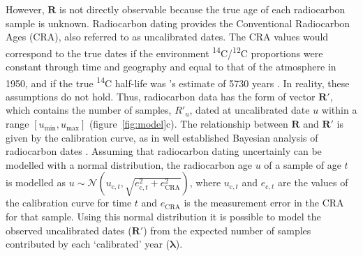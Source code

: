 \documentclass[a4paper]{article}
\begin{document}
However, $\bm{R}$ is not directly observable because the true age of each radiocarbon sample is unknown. Radiocarbon dating provides the Conventional Radiocarbon Ages (CRA), also referred to as uncalibrated dates. The CRA values would correspond to the true dates if the environment \textsuperscript{14}C/\textsuperscript{12}C proportions were constant through time and geography and equal to that of the atmosphere in 1950, and if the true \textsuperscript{14}C half-life was \citeauthor{Libby1949}'s \parencite*{Libby1949} estimate of 5730 years \parencite{BronkRamsey2008}. In reality, these assumptions do not hold. Thus, radiocarbon data has the form of vector $\bm{R'}$, which contains the number of samples, $R'_u$, dated at uncalibrated date $u$ within a range $\left[u_{\mathrm{min}},u_{\mathrm{max}}\right]$ (figure~\ref{fig:model}c). The relationship between $\bm{R}$ and $\bm{R'}$ is given by the calibration curve, as in well established Bayesian analysis of radiocarbon dates \parencite{BronkRamsey2008}. Assuming that radiocarbon dating uncertainly can be modelled with a normal distribution, the radiocarbon age $u$ of a sample of age $t$ is modelled as $u \sim \mathcal{N}\left(u_{\mathrm{c},t},\sqrt{e_{\mathrm{c},t}^2+e_{\mathrm{CRA}}^2}\right)$, where $u_{\mathrm{c},t}$ and $e_{\mathrm{c},t}$ are the values of the calibration curve for time $t$ and $e_{\mathrm{CRA}}$ is the measurement error in the CRA for that sample. Using this normal distribution it is possible to model the observed uncalibrated dates ($\bm{R'}$) from the expected number of samples contributed by each `calibrated' year ($\bm{\lambda}$).
\\

\end{document}
